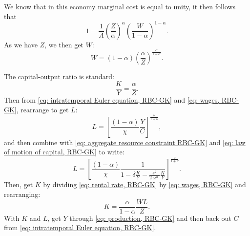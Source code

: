 \documentclass[12pt,english]{extarticle}
\begin{document}
	We know that in this economy marginal cost is equal to unity, it then follows that
	\begin{equation*}
		1 = \frac{1}{A}\left(\frac{Z}{\alpha}\right)^\alpha\left(\frac{W}{1-\alpha}\right)^{1-\alpha}.
	\end{equation*}
	As we have $Z$, we then get $W$:
	\begin{equation*}
		W = (1-\alpha)\left(\frac{\alpha}{Z}\right)^{\frac{\alpha}{1-\alpha}}.
	\end{equation*}
	
	The capital-output ratio is standard:
	\begin{equation*}
		\frac{K}{Y} = \frac{\alpha}{Z}.
	\end{equation*}
	Then from \eqref{eq: intratemporal Euler equation, RBC-GK} and \eqref{eq: wages, RBC-GK}, rearrange to get $L$:
	\begin{equation*}
		L = \left[\frac{(1-\alpha)}{\chi}\frac{Y}{C}\right]^{\frac{\nu}{1+\nu}},
	\end{equation*}
	and then combine with \eqref{eq: aggregate resource constraint RBC-GK} and \eqref{eq: law of motion of capital, RBC-GK} to write:
	\begin{equation*}
		L = \left[\frac{(1-\alpha)}{\chi}\frac{1}{1-\delta\frac{K}{Y}-\frac{s^2}{2\varkappa^h}\frac{K}{Y}}\right]^{\frac{\nu}{1+\nu}}.
	\end{equation*}
	Then, get $K$ by dividing \eqref{eq: rental rate, RBC-GK} by \eqref{eq: wages, RBC-GK} and rearranging:
	\begin{equation*}
		K = \frac{\alpha}{1-\alpha}\frac{WL}{Z}.
	\end{equation*}
	With $K$ and $L$, get $Y$ through \eqref{eq: production, RBC-GK} and then back out $C$ from \eqref{eq: intratemporal Euler equation, RBC-GK}.
	
\end{document}
